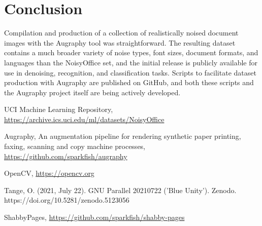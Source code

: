\documentclass[runningheads]{llncs}
\begin{document}
\section{Conclusion}
Compilation and production of a collection of realistically noised document images with the Augraphy tool was straightforward. The resulting dataset contains a much broader variety of noise types, font sizes, document formats, and languages than the NoisyOffice set, and the initial release is publicly available for use in denoising, recognition, and classification tasks. Scripts to facilitate dataset production with Augraphy are published on GitHub, and both these scripts and the Augraphy project itself are being actively developed.



\begin{thebibliography}{8}

  UCI Machine Learning Repository, \url{https://archive.ics.uci.edu/ml/datasets/NoisyOffice}

  Augraphy, An augmentation pipeline for rendering synthetic paper printing, faxing, scanning and copy machine processes, \url{https://github.com/sparkfish/augraphy}

  OpenCV, \url{https://opencv.org}

  Tange, O. (2021, July 22). GNU Parallel 20210722 ('Blue Unity').
  Zenodo. https://doi.org/10.5281/zenodo.5123056

ShabbyPages, \url{https://github.com/sparkfish/shabby-pages}
\end{thebibliography}
\end{document}
